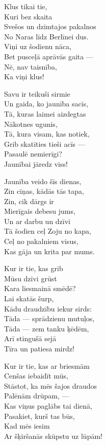 \documentclass[14pt]{extarticle}
\begin{document}
{{Klus tikai tie,\\
Kuri bez skaita\\
Svešos un dzimtajos pakalnos\\
No Naras līdz Berlīnei dus.\\
Viņi uz šodienu nāca,\\
Bet pusceļā aprāvās gaita ---\\
Nē, nav taisnība,\\
Ka viņi klus!

Savu ir teikuši sirmie\\
Un gaida, ko jaunība sacīs,\\
Tā, kuras laimei aizdegtas\\
Nākotnes ugunis,\\
Tā, kura visam, kas notiek,\\
Grib skatīties tieši acīs ---\\
Pasaulē nemierīgi?\\
Jaunībai jāredz viss!

Jaunība veido šīs dienas,\\
Zin cīņas, kādās tās tapa,\\
Zin, cik dārgs ir\\
Mierīgais debesu jums,\\
Un ar darbu un dzīvi\\
Tā šodien ceļ Zoju no kapa,\\
Ceļ no pakalniem visus,\\
Kas gāja un krita par mums. 

Kur ir tie, kas grib\\
Mūsu dzīvi grūst\\
Kara liesmainā smēdē?\\
Lai skatās šurp,\\
Kādu draudzību iekur sirds:\\
Tāda --- sprādzienu mutuļos,\\
Tāda --- zem tanku ķēdēm,\\
Arī stingušā sejā\\
Tīra un patiesa mirdz! 

Kur ir tie, kas ar briesmām\\
Cenšas iebaidīt mūs,\\
Stāstot, ka mēs šajos draudos\\
Palēnām drūpam, ---\\
Kas viņus paglābs tai dienā,\\
Pasakiet, kurš tas būs,\\
Kad mēs iesim\\
Ar šķiršanās skūpstu uz lūpām!

}}
\end{document}
